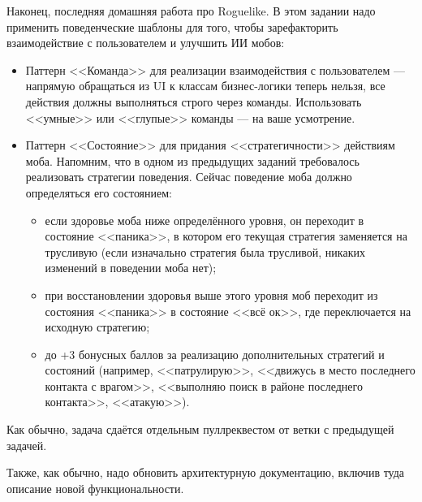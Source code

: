\documentclass[a5paper]{homework}
\begin{document}

Наконец, последняя домашняя работа про Roguelike. В этом задании надо применить поведенческие шаблоны для того, чтобы зарефакторить взаимодействие с пользователем и улучшить ИИ мобов:

\begin{itemize}
    \item Паттерн <<Команда>> для реализации взаимодействия с пользователем --- напрямую обращаться из UI к классам бизнес-логики теперь нельзя, все действия должны выполняться строго через команды. Использовать <<умные>> или <<глупые>> команды --- на ваше усмотрение.
    \item Паттерн <<Состояние>> для придания <<стратегичности>> действиям моба. Напомним, что в одном из предыдущих заданий требовалось реализовать стратегии поведения. Сейчас поведение моба должно определяться его состоянием:
    \begin{itemize}
        \item если здоровье моба ниже определённого уровня, он переходит в состояние <<паника>>, в котором его текущая стратегия заменяется на трусливую (если изначально стратегия была трусливой, никаких изменений в поведении моба нет);
        \item при восстановлении здоровья выше этого уровня моб переходит из состояния <<паника>> в состояние <<всё ок>>, где переключается на исходную стратегию;
        \item до +3 бонусных баллов за реализацию дополнительных стратегий и состояний (например, <<патрулирую>>, <<движусь в место последнего контакта с врагом>>, <<выполняю поиск в районе последнего контакта>>, <<атакую>>).
    \end{itemize}
\end{itemize}

Как обычно, задача сдаётся отдельным пуллреквестом от ветки с предыдущей задачей.

Также, как обычно, надо обновить архитектурную документацию, включив туда описание новой функциональности.
\end{document}
